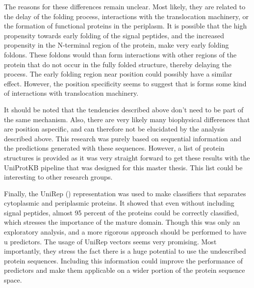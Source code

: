 The reasons for these differences remain unclear.
Most likely, they are related to the delay of the folding process,
interactions with the translocation machinery,
or the formation of functional proteins in the periplasm.
It is possible that the high propensity towards early folding of the signal peptides,
and the increased propensity in the N-terminal region of the protein,
make very early folding foldons.
These foldons would than form interactions with other regions of the protein that do not occur in the fully folded structure,
thereby delaying the process.
The early folding region near position could possibly have a similar effect.
However, the position specificity seems to suggest that is forms some kind of interactions with translocation machinery.

It should be noted that the tendencies described above don't need to be part of the same mechanism.
Also, there are very likely many biophysical differences that are position aspecific,
and can therefore not be elucidated by the analysis described above.
This research was purely based on sequential information and the predictions generated with these sequences.
However, a list of protein structures is provided as it was very straight forward to get these results with the UniProtKB pipeline that was designed for this master thesis. 
This list could be interesting to other research groups.

Finally, the UniRep (\cite{alley2019}) representation was used to make classifiers that separates cytoplasmic and periplasmic proteins.
It showed that even without including signal peptides,
almost 95 percent of the proteins could be  correctly classified, 
which stresses the importance of the mature domain.
Though this was only an exploratory analysis, and a more rigorous approach should be performed to have u predictors.
The usage of UniRep vectors seems very promising.
Most importantly, they stress the fact there is a huge potential to use the undescribed protein sequences.
Including this information could improve the performance of predictors and make them applicable on a wider portion of the protein sequence space.
